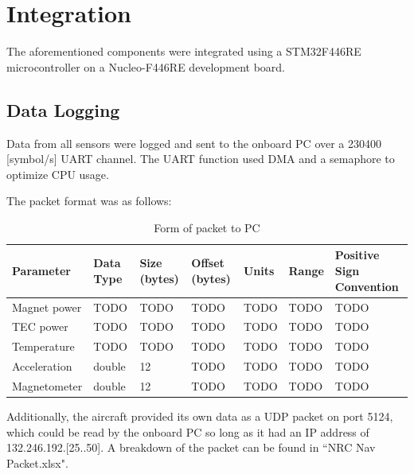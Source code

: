\documentclass{article}
\begin{document}
%
%
%
%

\section{Integration} \label{integration}
The aforementioned components were integrated using a STM32F446RE microcontroller on a Nucleo-F446RE development board.

\subsection{Data Logging}
Data from all sensors were logged and sent to the onboard PC over a 230400 [symbol/s] UART channel. The UART function used DMA and a semaphore to optimize CPU usage.

The packet format was as follows:

\begin{table}[!ht]
	\centering
	\begin{tabular}{ | m{3cm} | m{2cm} | m{2cm} | m{2cm}| m{2cm}| m{2cm}| m{2cm}|  } 
		\hline
		Parameter & Data Type & Size (bytes) & Offset (bytes) & Units & Range & Positive Sign Convention \\
		\hline
		Magnet power & TODO & TODO & TODO & TODO & TODO & TODO \\ 
		\hline
	    TEC power & TODO & TODO & TODO & TODO & TODO & TODO \\ 
		\hline
		Temperature & TODO & TODO & TODO & TODO & TODO & TODO \\ 
		\hline
		Acceleration & double & 12 & TODO & TODO & TODO & TODO \\ 
		\hline
		Magnetometer & double & 12 & TODO & TODO & TODO & TODO \\ 
		\hline
	\end{tabular}
	\caption{Form of packet to PC}
	\label{tab:PCPacketFormat}
\end{table}

Additionally, the aircraft provided its own data as a UDP packet on port 5124, which could be read by the onboard PC so long as it had an IP address of 132.246.192.[25..50]. A breakdown of the packet can be found in ``NRC Nav Packet.xlsx".
\clearpage

\end{document}
